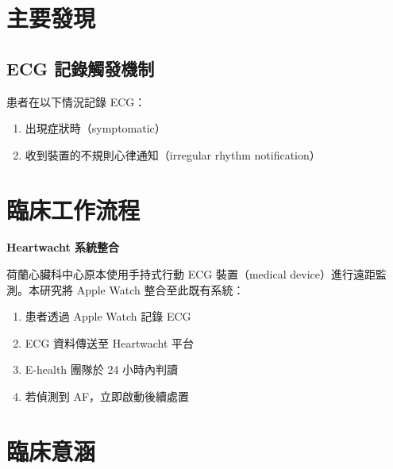 \documentclass[12pt,a4paper]{article}
\begin{document}
\section{主要發現}


\subsection{ECG 記錄觸發機制}
患者在以下情況記錄 ECG：
\begin{enumerate}
    \item 出現症狀時（symptomatic）
    \item 收到裝置的不規則心律通知（irregular rhythm notification）
\end{enumerate}

\section{臨床工作流程}

\begin{importantbox}
\textbf{Heartwacht 系統整合}

荷蘭心臟科中心原本使用手持式行動 ECG 裝置（medical device）進行遠距監測。本研究將 Apple Watch 整合至此既有系統：

\begin{enumerate}
    \item 患者透過 Apple Watch 記錄 ECG
    \item ECG 資料傳送至 Heartwacht 平台
    \item E-health 團隊於 24 小時內判讀
    \item 若偵測到 AF，立即啟動後續處置
\end{enumerate}
\end{importantbox}

\section{臨床意涵}
\end{document}
